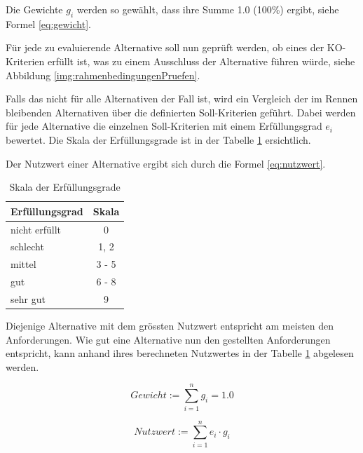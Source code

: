   Die Gewichte \(g_i\) werden so gewählt, dass ihre Summe 1.0 (100\%) ergibt,
  siehe Formel \ref{eq:gewicht}.
  
  Für jede zu evaluierende Alternative soll nun geprüft werden, ob eines
  der KO-Kriterien erfüllt ist, was zu einem Ausschluss der Alternative führen
  würde, siehe Abbildung \ref{img:rahmenbedingungenPruefen}.
  
  Falls das nicht für alle Alternativen der Fall ist, wird ein Vergleich der
  im Rennen bleibenden Alternativen über die definierten Soll-Kriterien
  geführt. Dabei werden für jede Alternative die einzelnen Soll-Kriterien mit
  einem Erfüllungsgrad \(e_i\) bewertet. Die Skala der Erfüllungsgrade ist in
  der Tabelle \ref{tab:erfuellungsgrade} ersichtlich.
  
  Der Nutzwert einer Alternative ergibt sich durch die Formel \ref{eq:nutzwert}.
  \newline
  
  \begin{table}[hbt]
    \sffamily 
    \begin{center}
      \begin{tabular}{lc}
        \toprule
        \textbf{Erfüllungsgrad} & \textbf{Skala}\\
        \midrule
        nicht erfüllt & 0\\
        schlecht & 1, 2\\
        mittel & 3 - 5\\
        gut & 6 - 8\\
        sehr gut & 9\\
        \bottomrule
      \end{tabular}
      \caption{Skala der Erfüllungsgrade}
      \label{tab:erfuellungsgrade}
    \end{center}
  \end{table}
  
  Diejenige Alternative mit dem grössten Nutzwert entspricht am meisten den
  Anforderungen. Wie gut eine Alternative nun den gestellten Anforderungen
  entspricht, kann anhand ihres berechneten Nutzwertes in der Tabelle
  \ref{tab:erfuellungsgrade} abgelesen werden.

  \begin{equation}
    \label{eq:gewicht}
    Gewicht := \sum \limits_{i=1}^n g_i = 1.0
  \end{equation}
  
  \begin{equation}
    \label{eq:nutzwert}
    Nutzwert := \sum \limits_{i=1}^n e_i \cdot g_i
  \end{equation}
  
